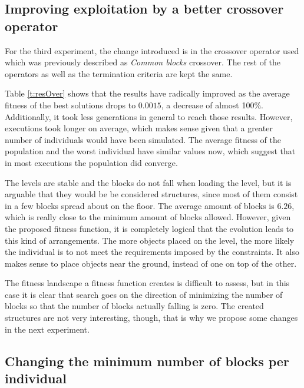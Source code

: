 \documentclass[sigconf]{acmart}
\begin{document}
\subsection{Improving exploitation by a better crossover operator}

For the third experiment, the change introduced is in the crossover operator 
used which was previously described as \textit{Common blocks} crossover. 
The rest of the operators as 
well as the termination criteria are kept the same. 

Table \ref{t:resOver} shows that the results have radically improved as the 
average fitness of the best solutions drops to $0.0015$, a decrease of almost 
100\%. Additionally, it took less generations in general to reach those 
results. However, executions took longer on average, which makes sense given 
that a greater number of individuals would have been simulated. The average 
fitness of the population and the worst individual have similar values now, 
which suggest that in most executions the population did converge.

The levels are stable and the blocks do not fall when loading the level, but 
it is arguable that they would be be considered structures, since most of them consist in a 
few blocks spread about on the floor. The average amount of blocks is $6.26$, 
which is really close to the minimum amount of blocks allowed. However, given 
the proposed fitness function, it is completely logical that the evolution 
leads to this kind of arrangements. The more objects placed on the level, the 
more likely the individual is to not meet the requirements imposed by the 
constraints. It also makes sense to place objects near the ground, instead of 
one on top of the other.

The fitness landscape a fitness function creates is difficult to
assess, but in this case it is clear that search goes on the direction
of minimizing the number of blocks so that the number of blocks
actually falling is zero. The created structures are not very
interesting, though, that is why we propose some changes in the next experiment.

\subsection{Changing the minimum number of blocks per individual}
\end{document}
